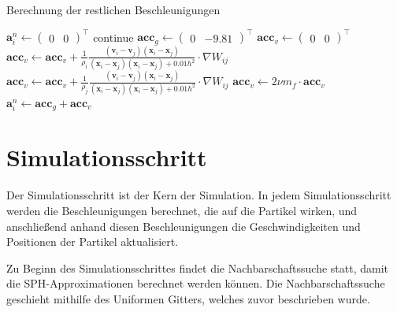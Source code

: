 \documentclass[11pt,
a4paper,
parskip=half, %
BCOR=10mm, %
english,
ngerman]{scrreprt}
\begin{document}
\begin{algorithm}
    \caption{Berechnung der restlichen Beschleunigungen}
    \label{alg:other_accelerations}
    \begin{algorithmic}
            \State $\textbf{a}_i^n \gets \begin{pmatrix}0 & 0 \end{pmatrix}^\intercal$
            \State continue
        \EndIf
        \State $\textbf{acc}_g \gets \begin{pmatrix}0 &-9.81 \end{pmatrix}^\intercal$
        \State $\textbf{acc}_v \gets \begin{pmatrix}0 & 0 \end{pmatrix}^\intercal$
        \State
        \State {}
                \State $\textbf{acc}_v \gets \textbf{acc}_v + \frac{1}{\rho_i} \frac{(\textbf{v}_i - \textbf{v}_j)(\textbf{x}_i - \textbf{x}_j)}{(\textbf{x}_i - \textbf{x}_j)(\textbf{x}_i - \textbf{x}_j) + 0.01h^2} \cdot \nabla W_{ij}$
            \Else
                \State $\textbf{acc}_v \gets \textbf{acc}_v + \frac{1}{\rho_j} \frac{(\textbf{v}_i - \textbf{v}_j)(\textbf{x}_i - \textbf{x}_j)}{(\textbf{x}_i - \textbf{x}_j)(\textbf{x}_i - \textbf{x}_j) + 0.01h^2} \cdot \nabla W_{ij}$
            \EndIf
        \EndFor
        \State $\textbf{acc}_v \gets 2\nu m_f \cdot \textbf{acc}_v$
        \State
        \State $\textbf{a}_i^n \gets \textbf{acc}_g + \textbf{acc}_v$
    \EndFor
    \end{algorithmic}
    \end{algorithm}


\section{Simulationsschritt}
Der Simulationsschritt ist der Kern der Simulation.
In jedem Simulationsschritt werden die Beschleunigungen berechnet, die auf die Partikel wirken,
und anschließend anhand diesen Beschleunigungen die Geschwindigkeiten und Positionen der Partikel aktualisiert.

Zu Beginn des Simulationsschrittes findet die Nachbarschaftssuche statt, damit die SPH-Approximationen berechnet werden können.
Die Nachbarschaftssuche geschieht mithilfe des Uniformen Gitters, welches zuvor beschrieben wurde.
\end{document}
